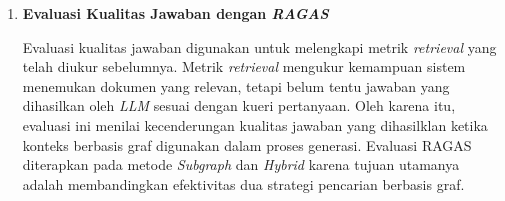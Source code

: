 \begin{enumerate}[label=\textbf{(\alph*)}, leftmargin=*, itemsep=10pt]
          \begin{figure}[htbp]
              \centering
              \caption{Perbandingan \textit{MRR} Antarmetode \textit{Retrieval} per Kategori}
              \label{fig:eval-mrr}
          \end{figure}


    \item \textbf{Evaluasi Kualitas Jawaban dengan \textit{RAGAS}}

          \hspace*{0.75cm} Evaluasi kualitas jawaban digunakan untuk melengkapi metrik \textit{retrieval} yang telah diukur sebelumnya. Metrik \textit{retrieval} mengukur kemampuan sistem menemukan dokumen yang relevan, tetapi belum tentu jawaban yang dihasilkan oleh \textit{LLM} sesuai dengan kueri pertanyaan. Oleh karena itu, evaluasi ini menilai kecenderungan kualitas jawaban yang dihasilklan ketika konteks berbasis graf digunakan dalam proses generasi. Evaluasi RAGAS diterapkan pada metode \textit{Subgraph} dan \textit{Hybrid} karena tujuan utamanya adalah membandingkan efektivitas dua strategi pencarian berbasis graf.


\end{enumerate}
